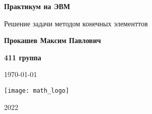 \begin{titlepage}
	\begin{center}
		\Huge
		\textbf{Практикум на ЭВМ}
		\vspace{0.5cm}
		
		\Large
		Решение задачи методом конечных элементтов
		\vspace{1.5cm}
		
		\LARGE
		\textbf{Прокашев Максим Павлович}
		
		\vspace{0.5cm}
		\textbf{411 группа}
		
		\vspace{0.5cm}
		\today
		
		\vfill
		\texttt{[image: math\_logo]}
		\vspace{0.5cm}
		
		\Large
		2022
	\end{center}
\end{titlepage}